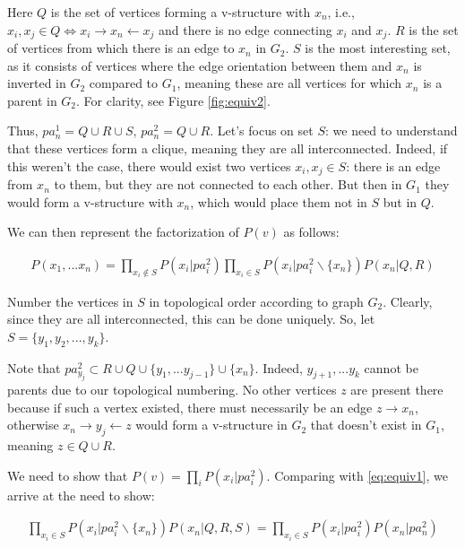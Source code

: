 \documentclass[fleqn]{article}
\numberwithin{equation}{section}
\numberwithin{theorem}{section}
\numberwithin{figure}{section}
\numberwithin{lemma}{section}
\numberwithin{corollary}{section}
\begin{document}
Here \( Q \) is the set of vertices forming a v-structure with \( x_n \), i.e., \( x_i, x_j \in Q \iff x_i \rightarrow x_n \leftarrow x_j \) and there is no edge connecting \( x_i \) and \( x_j \). \( R \) is the set of vertices from which there is an edge to \( x_n \) in \( G_2 \). \( S \) is the most interesting set, as it consists of vertices where the edge orientation between them and \( x_n \) is inverted in \( G_2 \) compared to \( G_1 \), meaning these are all vertices for which \( x_n \) is a parent in \( G_2 \). For clarity, see Figure \ref{fig:equiv2}.

Thus, \( pa^1_n = Q \cup R \cup S \), \( pa^2_n = Q \cup R \). Let's focus on set \( S \): we need to understand that these vertices form a clique, meaning they are all interconnected. Indeed, if this weren't the case, there would exist two vertices \( x_i, x_j \in S \): there is an edge from \( x_n \) to them, but they are not connected to each other. But then in \( G_1 \) they would form a v-structure with \( x_n \), which would place them not in \( S \) but in \( Q \). 

We can then represent the factorization of \( P(v) \) as follows:

\begin{align}
	P(x_1,...x_{n}) =  \prod\limits_{x_i\notin S}P(x_i|pa^2_{i})\prod\limits_{x_i\in S}P(x_i|pa^2_{i} \backslash \{x_n\}) P(x_n|Q, R)
	\label{eq:equiv1}
\end{align}

Number the vertices in \( S \) in topological order according to graph \( G_2 \). Clearly, since they are all interconnected, this can be done uniquely. So, let \( S = \{y_1,y_2,...,y_k\} \). 

Note that \( pa^2_{y_j} \subset R \cup Q \cup \{y_1,...y_{j-1}\} \cup \{x_n\} \). Indeed, \( y_{j+1},...y_{k} \) cannot be parents due to our topological numbering. No other vertices \( z \) are present there because if such a vertex existed, there must necessarily be an edge \( z \rightarrow x_n \), otherwise \( x_n \rightarrow y_j \leftarrow z \) would form a v-structure in \( G_2 \) that doesn't exist in \( G_1 \), meaning \( z \in Q \cup R \).

We need to show that \( P(v) = \prod\limits_{i}P(x_i|pa^2_{i}) \). Comparing with \ref{eq:equiv1}, we arrive at the need to show:

\begin{align}
	\prod\limits_{x_i\in S}P(x_i|pa^2_{i} \backslash \{x_n\}) P(x_n|Q, R, S) =  \prod\limits_{x_i \in S}P(x_i|pa^2_{i}) P(x_n|pa^2_n)
	\label{eq:equiv2}
\end{align}
\end{document}
